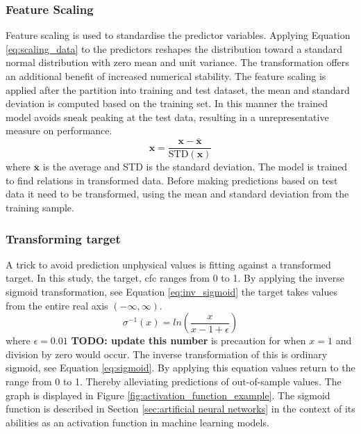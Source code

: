 
\subsubsection{Feature Scaling} \label{sec:scaling_predictors}
Feature scaling is used to standardise the predictor variables.
Applying Equation \eqref{eq:scaling_data} to the predictors reshapes the distribution toward a standard normal distribution with zero mean and unit variance. 
The transformation offers an additional benefit of increased numerical stability. %
The feature scaling is applied after the partition into training and test dataset, the mean and standard deviation is computed based on the training set. In this manner the trained model avoids sneak peaking at the test data, resulting in a unrepresentative measure on performance.
\begin{equation} \label{eq:scaling_data}
    \mathbf{x} = \frac{\mathbf{x} - \bar{\mathbf{x}}}{\text{STD}(\mathbf{x})}
\end{equation}
where $\bar{\mathbf{x}}$ is the average and STD is the standard deviation. 
The model is trained to find relations in transformed data. Before making predictions based on test data it need to be transformed, using the mean and standard deviation from the training sample.

\subsubsection{Transforming target} \label{sec:transforming_target}
A trick to avoid prediction unphysical values is fitting against a transformed target. In this study, the target, \acrfull{cfc} ranges from 0 to 1. By applying the inverse sigmoid transformation, see Equation \eqref{eq:inv_sigmoid} the target takes values from the entire real axis $(-\infty, \infty)$. 
\begin{equation} \label{eq:inv_sigmoid}
   \sigma^{-1} \left( x \right) = ln \left(\frac{x}{x - 1 + \epsilon} \right)
\end{equation}
where $\epsilon = 0.01$ \textbf{TODO: update this number} is precaution for when $x=1$ and division by zero would occur. 
The inverse transformation of this is ordinary sigmoid, see Equation \eqref{eq:sigmoid}. By applying this equation values return to the range from 0 to 1. Thereby alleviating predictions of out-of-sample values. The graph is displayed in Figure \ref{fig:activation_function_example}. The sigmoid function is described in Section \ref{sec:artificial neural networks} in the context of its abilities as an activation function in machine learning models. 

